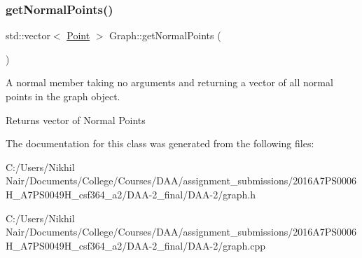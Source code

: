 \subsubsection{\texorpdfstring{getNormalPoints()}{getNormalPoints()}}
{\footnotesize\ttfamily std\+::vector$<$ \mbox{\hyperlink{struct_point}{Point}} $>$ Graph\+::get\+Normal\+Points (\begin{DoxyParamCaption}{ }\end{DoxyParamCaption})}



A normal member taking no arguments and returning a vector of all normal points in the graph object. 

\begin{DoxyReturn}{Returns}
vector of Normal Points 
\end{DoxyReturn}


The documentation for this class was generated from the following files\+:\begin{DoxyCompactItemize}
\item 
C\+:/\+Users/\+Nikhil Nair/\+Documents/\+College/\+Courses/\+D\+A\+A/assignment\+\_\+submissions/2016\+A7\+P\+S0006\+H\+\_\+A7\+P\+S0049\+H\+\_\+csf364\+\_\+a2/\+D\+A\+A-\/2\+\_\+final/\+D\+A\+A-\/2/graph.\+h\item 
C\+:/\+Users/\+Nikhil Nair/\+Documents/\+College/\+Courses/\+D\+A\+A/assignment\+\_\+submissions/2016\+A7\+P\+S0006\+H\+\_\+A7\+P\+S0049\+H\+\_\+csf364\+\_\+a2/\+D\+A\+A-\/2\+\_\+final/\+D\+A\+A-\/2/graph.\+cpp\end{DoxyCompactItemize}
